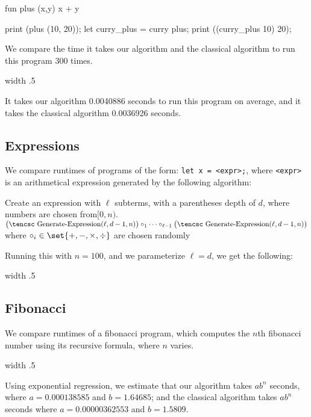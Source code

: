 fun plus (x,y) {
    x + y
}

print (plus (10, 20));
let curry_plus = curry plus;
print ((curry_plus 10) 20);
\endhi

We compare the time it takes our algorithm and the classical algorithm to run this program 300 times.

\medskip
\pdfximage width .5
\centerline{\pdfrefximage\the\pdflastximage}
\medskip

It takes our algorithm 0.0040886 seconds to run this program on average, and it takes the classical algorithm 0.0036926 seconds.

\subsection{Expressions}

We compare runtimes of programs of the form: {\tt let x = <expr>;}, where {\tt<expr>} is an arithmetical expression generated by the following algorithm:

\medskip
\algorithm
\Comment Create an expression with $\ell$ subterms, with a parentheses depth of $d$, where numbers are chosen from\cr $[0,n)$.\EndComment
{}
     \vtop{\hsize=.8\hsize
        \noindent \Return an expression with $\ell$ random numbers in $[0,n)$ and $\ell-1$ random operators in $\set{+,-,\times,\div}$.}
    \State \Return $\bigl(\hbox{\tencsc Generate-Expression}(\ell,d-1,n)\bigr)\circ_1\cdots\circ_{\ell-1}\bigl(\hbox{\tencsc Generate-Expression}(\ell,d-1,n)\bigr)$
    \nonum\State where $\circ_i\in\set{+,-,\times,\div}$ are chosen randomly
\EndFunc
\ealgorithm
\medskip

Running this with $n=100$, and we parameterize $\ell=d$, we get the following:

\medskip
\pdfximage width .5
\centerline{\pdfrefximage\the\pdflastximage}
\medskip

\subsection{Fibonacci}

We compare runtimes of a fibonacci program, which computes the $n$th fibonacci number using its recursive formula, where $n$ varies.

\medskip
\pdfximage width .5
\centerline{\pdfrefximage\the\pdflastximage}
\medskip

Using exponential regression, we estimate that our algorithm takes $ab^n$ seconds, where $a=0.000138585$ and $b=1.64685$; and the classical algorithm takes $ab^n$ seconds where $a=0.00000362553$ and
$b=1.5809$.

\bye

